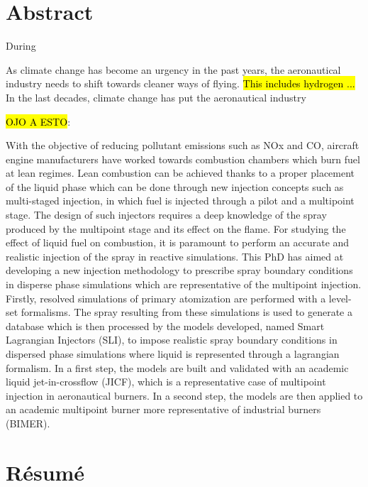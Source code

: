 \chapter*{Abstract}
    
During
    
As climate change has become an urgency in the past years, the aeronautical industry needs to shift towards cleaner ways of flying. \hl{This includes hydrogen ...} \\

In the last decades, climate change has put the aeronautical industry 

\hl{OJO A ESTO}:
        
With the objective of reducing pollutant emissions such as NOx and CO, aircraft engine manufacturers have worked towards combustion chambers which burn fuel at lean regimes. Lean combustion can be achieved thanks to a proper placement of the liquid phase which can be done through new injection concepts such as multi-staged injection, in which fuel is injected through a pilot and a multipoint stage. The design of such injectors requires a deep knowledge of the spray produced by the multipoint stage and its effect on the flame. For studying the effect of liquid fuel on combustion, it is paramount to perform an accurate and realistic injection of the spray in reactive simulations. This PhD has aimed at developing a new injection methodology to prescribe spray boundary conditions in disperse phase simulations which are representative of the multipoint injection. Firstly, resolved simulations of primary atomization are performed with a level-set formalisms. The spray resulting from these simulations is used to generate a database which is then processed by the models developed, named Smart Lagrangian Injectors (SLI), to impose realistic spray boundary conditions in dispersed phase simulations where liquid is represented through a lagrangian formalism. In a first step, the models are built and validated with an academic liquid jet-in-crossflow (JICF), which is a representative case of multipoint injection in aeronautical burners. In a second step, the models are then applied to an academic multipoint burner more representative of industrial burners (BIMER).
        
    
\newpage
\shipout\null 
\newpage
    
\chapter*{Résumé}
